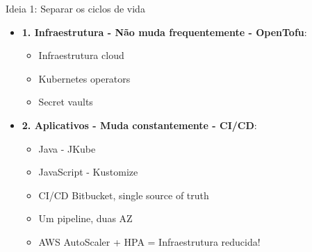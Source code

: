 \documentclass[aspectratio=169]{beamer}
\begin{document}
\begin{frame}{Ideia 1: Separar os ciclos de vida}
	
	\begin{itemize}
		\item \textbf{1. Infraestrutura - Não muda frequentemente - OpenTofu}:
		\begin{itemize}
			\item Infraestrutura cloud
			\item Kubernetes operators
			\item Secret vaults
		\end{itemize}
		\item \textbf{2. Aplicativos - Muda constantemente - CI/CD}:
		\begin{itemize}
			\item Java - JKube
			\item JavaScript - Kustomize
			\item CI/CD Bitbucket, single source of truth
			\item Um pipeline, duas AZ
			\item AWS AutoScaler + HPA = Infraestrutura reducida!
		\end{itemize}
	\end{itemize}
\end{frame}
\end{document}
